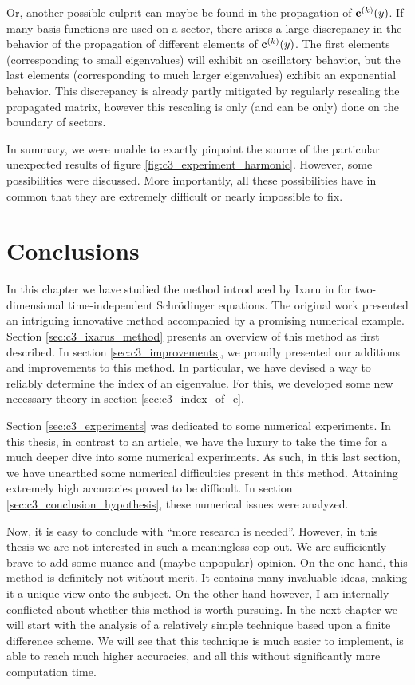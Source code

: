 Or, another possible culprit can maybe be found in the propagation of $\vb{c}^{(k)}(y)$. If many basis functions are used on a sector, there arises a large discrepancy in the behavior of the propagation of different elements of $\vb{c}^{(k)}(y)$. The first elements (corresponding to small eigenvalues) will exhibit an oscillatory behavior, but the last elements (corresponding to much larger eigenvalues) exhibit an exponential behavior. This discrepancy is already partly mitigated by regularly rescaling the propagated matrix, however this rescaling is only (and can be only) done on the boundary of sectors.

In summary, we were unable to exactly pinpoint the source of the particular unexpected results of figure \ref{fig:c3_experiment_harmonic}. However, some possibilities were discussed. More importantly, all these possibilities have in common that they are extremely difficult or nearly impossible to fix.


\section{Conclusions}

In this chapter we have studied the method introduced by Ixaru in \cite{ixaru_new_2010} for two-dimensional time-independent Schrödinger equations. The original work presented an intriguing innovative method accompanied by a promising numerical example. Section \ref{sec:c3_ixarus_method} presents an overview of this method as first described. In section \ref{sec:c3_improvements}, we proudly presented our additions and improvements to this method. In particular, we have devised a way to reliably determine the index of an eigenvalue. For this, we developed some new necessary theory in section \ref{sec:c3_index_of_e}.

Section \ref{sec:c3_experiments} was dedicated to some numerical experiments. In this thesis, in contrast to an article, we have the luxury to take the time for a much deeper dive into some numerical experiments. As such, in this last section, we have unearthed some numerical difficulties present in this method. Attaining extremely high accuracies proved to be difficult. In section \ref{sec:c3_conclusion_hypothesis}, these numerical issues were analyzed.

Now, it is easy to conclude with ``more research is needed''. However, in this thesis we are not interested in such a meaningless cop-out. We are sufficiently brave to add some nuance and (maybe unpopular) opinion. On the one hand, this method is definitely not without merit. It contains many invaluable ideas, making it a unique view onto the subject. On the other hand however, I am internally conflicted about whether this method is worth pursuing. In the next chapter we will start with the analysis of a relatively simple technique based upon a finite difference scheme. We will see that this technique is much easier to implement, is able to reach much higher accuracies, and all this without significantly more computation time.

